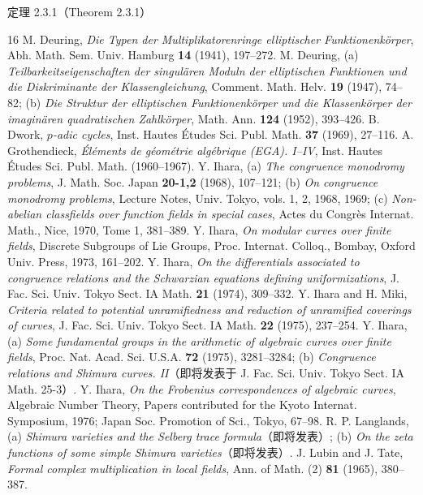 \begin{originaltheorem}{定理 2.3.1（Theorem 2.3.1）}
\begin{thebibliography}{16}
 M. Deuring, \textit{Die Typen der Multiplikatorenringe elliptischer Funktionenkörper}, Abh. Math. Sem. Univ. Hamburg \textbf{14} (1941), 197--272.
 M. Deuring, (a) \textit{Teilbarkeitseigenschaften der singulären Moduln der elliptischen Funktionen und die Diskriminante der Klassengleichung}, Comment. Math. Helv. \textbf{19} (1947), 74--82; (b) \textit{Die Struktur der elliptischen Funktionenkörper und die Klassenkörper der imaginären quadratischen Zahlkörper}, Math. Ann. \textbf{124} (1952), 393--426.
 B. Dwork, \textit{$p$-adic cycles}, Inst. Hautes Études Sci. Publ. Math. \textbf{37} (1969), 27--116.
 A. Grothendieck, \textit{Éléments de géométrie algébrique (EGA). I--IV}, Inst. Hautes Études Sci. Publ. Math. (1960--1967).
 Y. Ihara, (a) \textit{The congruence monodromy problems}, J. Math. Soc. Japan \textbf{20-1,2} (1968), 107--121; (b) \textit{On congruence monodromy problems}, Lecture Notes, Univ. Tokyo, vols. 1, 2, 1968, 1969; (c) \textit{Non-abelian classfields over function fields in special cases}, Actes du Congrès Internat. Math., Nice, 1970, Tome 1, 381--389.
 Y. Ihara, \textit{On modular curves over finite fields}, Discrete Subgroups of Lie Groups, Proc. Internat. Colloq., Bombay, Oxford Univ. Press, 1973, 161--202.
 Y. Ihara, \textit{On the differentials associated to congruence relations and the Schwarzian equations defining uniformizations}, J. Fac. Sci. Univ. Tokyo Sect. IA Math. \textbf{21} (1974), 309--332.
 Y. Ihara and H. Miki, \textit{Criteria related to potential unramifiedness and reduction of unramified coverings of curves}, J. Fac. Sci. Univ. Tokyo Sect. IA Math. \textbf{22} (1975), 237--254.
 Y. Ihara, (a) \textit{Some fundamental groups in the arithmetic of algebraic curves over finite fields}, Proc. Nat. Acad. Sci. U.S.A. \textbf{72} (1975), 3281--3284; (b) \textit{Congruence relations and Shimura curves. II}（即将发表于 J. Fac. Sci. Univ. Tokyo Sect. IA Math. 25-3）.
 Y. Ihara, \textit{On the Frobenius correspondences of algebraic curves}, Algebraic Number Theory, Papers contributed for the Kyoto Internat. Symposium, 1976; Japan Soc. Promotion of Sci., Tokyo, 67--98.
 R. P. Langlands, (a) \textit{Shimura varieties and the Selberg trace formula}（即将发表）; (b) \textit{On the zeta functions of some simple Shimura varieties}（即将发表）.
 J. Lubin and J. Tate, \textit{Formal complex multiplication in local fields}, Ann. of Math. (2) \textbf{81} (1965), 380--387.

\end{thebibliography}
\end{originaltheorem}
